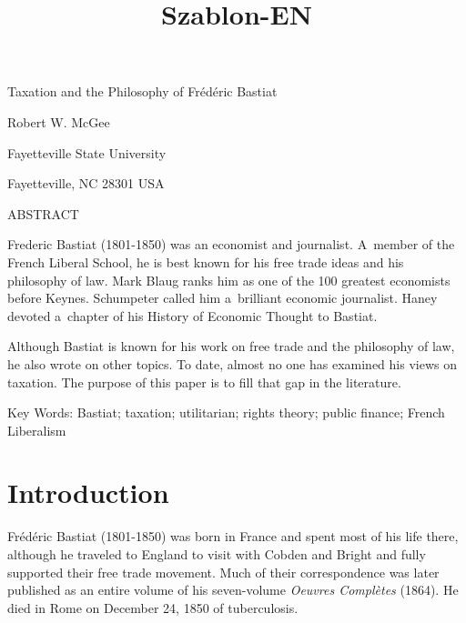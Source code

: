 \setcounter{secnumdepth}{2}



\title{Szablon-EN}



Taxation and the Philosophy of Frédéric Bastiat





Robert W. McGee





Fayetteville State University





Fayetteville, NC 28301 USA





ABSTRACT



Frederic Bastiat (1801-1850) was an economist and journalist. A~member of the French Liberal School, he is best known for his free trade ideas and his philosophy of law. Mark Blaug ranks him as one of the 100 greatest economists before Keynes. Schumpeter called him a~brilliant economic journalist. Haney devoted a~chapter of his History of Economic Thought to Bastiat.



Although Bastiat is known for his work on free trade and the philosophy of law, he also wrote on other topics. To date, almost no one has examined his views on taxation. The purpose of this paper is to fill that gap in the literature.



Key Words: Bastiat; taxation; utilitarian; rights theory; public finance; French Liberalism



\section{Introduction}

Frédéric Bastiat (1801-1850) was born in France and spent most of his life there, although he traveled to England to visit with Cobden and Bright and fully supported their free trade movement. Much of their correspondence was later published as an entire volume of his seven-volume \textit{Oeuvres Complètes} (1864). He died in Rome on December 24, 1850 of tuberculosis.



